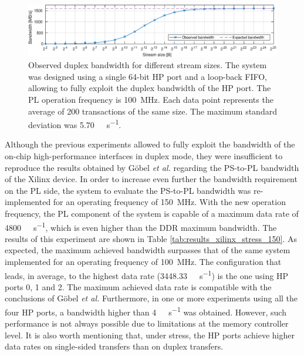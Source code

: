 \begin{figure}[!t]
    \centering
    \includegraphics[width=\linewidth]{figures/xilinx_var_stream_size.eps}
    \caption{Observed duplex bandwidth for different stream sizes. The system was designed using a single 64-bit \ac{HP} port and a loop-back \ac{FIFO}, allowing to fully exploit the duplex bandwidth of the \ac{HP} port. The \ac{PL} operation frequency is \SI{100}{\mega\hertz}. Each data point represents the average of 200 transactions of the same size. The maximum standard deviation was \SI{5.70}{\mega\byte\per\second}.}
    \label{fig:xilinx_results_var_size}
\end{figure}


Although the previous experiments allowed to fully exploit the bandwidth of the on-chip high-performance interfaces in duplex mode, they were insufficient to reproduce the results obtained by G{\"{o}}bel \textit{et al.} regarding the \ac{PS}-to-\ac{PL} bandwidth of the Xilinx device. In order to increase even further the bandwidth requirement on the \ac{PL} side, the system to evaluate the \ac{PS}-to-\ac{PL} bandwidth was re-implemented for an operating frequency of \SI{150}{\mega\hertz}. With the new operation frequency, the \ac{PL} component of the system is capable of a maximum data rate of \SI{4800}{\mega\byte\per\second}, which is even higher than the DDR maximum bandwidth. The results of this experiment are shown in Table \ref{tab:results_xilinx_stress_150}. As expected, the maximum achieved bandwidth surpasses that of the same system implemented for an operating frequency of \SI{100}{MHz}. The configuration that leads, in average, to the highest data rate (\SI{3448.33}{\mega\byte\per\second}) is the one using \ac{HP} ports 0, 1 and 2. The maximum achieved data rate is compatible with the conclusions of G{\"{o}}bel \textit{et al.} Furthermore, in one or more experiments using all the four \ac{HP} ports, a bandwidth higher than \SI{4}{\giga\byte\per\second} was obtained. However, such performance is not always possible due to limitations at the memory controller level. It is also worth mentioning that, under stress, the \ac{HP} ports achieve higher data rates on single-sided transfers than on duplex transfers.

